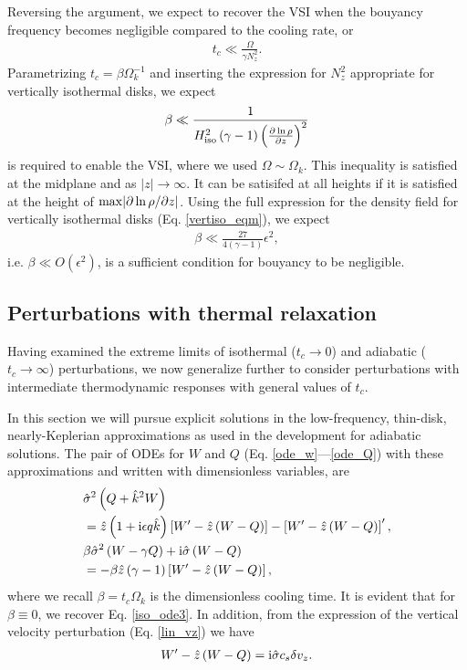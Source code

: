 Reversing the argument, we expect to recover the VSI when the bouyancy
frequency becomes negligible compared to the cooling rate, or 
\begin{align}
  t_c \ll \frac{\Omega}{\gamma N_z^2}. 
\end{align} 
Parametrizing $t_c = \beta\Omega_k^{-1}$ and inserting the expression
for $N_z^2$ appropriate for vertically isothermal disks, we expect
\begin{align}
  \beta \ll
  \frac{1}{H^2_\mathrm{iso}\left(\gamma-1\right)\left(\frac{\partial\ln\rho}{\partial
          z}\right)^2} 
\end{align}
is required to enable the VSI, where we used $\Omega\sim\Omega_k$.  
This inequality is satisfied at the
midplane and as $|z|\to\infty$. It can be satisifed at all heights if
it is satisfied at the height of $\mathrm{max}|\partial\ln\rho/\partial z|$. 
Using the full expression for the density field for vertically isothermal
disks (Eq. \ref{vertiso_eqm}), we expect 
\begin{align}
  \beta \ll \frac{27}{4(\gamma-1)}\epsilon^2,
\end{align}
i.e. $\beta\ll O(\epsilon^2)$, is a sufficient condition for
bouyancy to be negligible.  


\subsection{Perturbations with thermal relaxation}
Having examined the extreme limits of isothermal ($t_c\to0$) and
adiabatic ($t_c\to\infty$) perturbations, we now generalize further to consider
perturbations with intermediate thermodynamic responses with general
values of $t_c$. 

In this section we will pursue explicit solutions in the low-frequency,
thin-disk, nearly-Keplerian approximations as used in the development
for adiabatic solutions. The pair of ODEs for $W$ and $Q$
(Eq. \ref{ode_w}---\ref{ode_Q}) with these approximations and 
written with dimensionless variables, are
\begin{align}
  &\hat{\sigma}^2\left(Q +  \hat{k}^2W\right) \notag\\ 
  &= \hat{z} \left(1 +
    \mathrm{i}\epsilon q \hat{k} \right)\left[W^\prime - \hat{z} \left(W -
      Q\right)\right] - \left[W^\prime - \hat{z} \left(W -
      Q\right)\right]^\prime\label{nearly_iso1},\\
&\beta \hat{\sigma}^2\left(W - \gamma Q\right) + \mathrm{i}\hat{\sigma}
    \left(W-Q\right)\notag\\
   & = -\beta\hat{z}\left(\gamma-1\right) \left[W^\prime - \hat{z} \left(W -
      Q\right)\right]\label{nearly_iso2},
\end{align}
where we recall $\beta = t_c\Omega_k$ is the dimensionless cooling
time. It is evident that for $\beta\equiv 0$, we recover
Eq. \ref{iso_ode3}. In addition, from the expression of the vertical
velocity perturbation (Eq. \ref{lin_vz}) we have
\begin{align}
  W^\prime - \hat{z} \left(W -
      Q\right) = \mathrm{i}\hat{\sigma}c_s\delta v_z. \label{nearly_vz}
\end{align}

